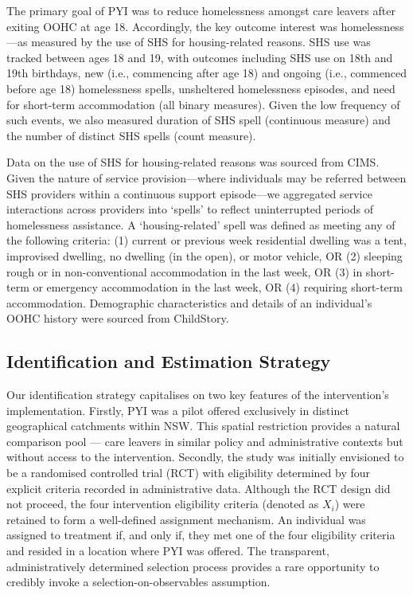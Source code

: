 \documentclass[
  jou,
  floatsintext,
  longtable,
  nolmodern,
  notxfonts,
  notimes,
  colorlinks=true,linkcolor=blue,citecolor=blue,urlcolor=blue]{apa7}
\begin{document}
The primary goal of PYI was to reduce homelessness amongst care leavers
after exiting OOHC at age 18. Accordingly, the key outcome interest was
homelessness---as measured by the use of SHS for housing-related
reasons. SHS use was tracked between ages 18 and 19, with outcomes
including SHS use on 18th and 19th birthdays, new (i.e., commencing
after age 18) and ongoing (i.e., commenced before age 18) homelessness
spells, unsheltered homelessness episodes, and need for short-term
accommodation (all binary measures). Given the low frequency of such
events, we also measured duration of SHS spell (continuous measure) and
the number of distinct SHS spells (count measure). ~

Data on the use of SHS for housing-related reasons was sourced from
CIMS. Given the nature of service provision---where individuals may be
referred between SHS providers within a continuous support episode---we
aggregated service interactions across providers into `spells' to
reflect uninterrupted periods of homelessness assistance. A
`housing-related' spell was defined as meeting any of the following
criteria: (1) current or previous week residential dwelling was a tent,
improvised dwelling, no dwelling (in the open), or motor vehicle, OR (2)
sleeping rough or in non-conventional accommodation in the last week, OR
(3) in short-term or emergency accommodation in the last week, OR (4)
requiring short-term accommodation. Demographic characteristics and
details of an individual's OOHC history were sourced from ChildStory.

\subsection{Identification and Estimation
Strategy}\label{identification-and-estimation-strategy}

Our identification strategy capitalises on two key features of the
intervention's implementation. Firstly, PYI was a pilot offered
exclusively in distinct geographical catchments within NSW. This spatial
restriction provides a natural comparison pool --- care leavers in
similar policy and administrative contexts but without access to the
intervention. Secondly, the study was initially envisioned to be a
randomised controlled trial (RCT) with eligibility determined by four
explicit criteria recorded in administrative data. Although the RCT
design did not proceed, the four intervention eligibility criteria
(denoted as \(X_i\)) were retained to form a well-defined assignment
mechanism. An individual was assigned to treatment if, and only if, they
met one of the four eligibility criteria and resided in a location where
PYI was offered. The transparent, administratively determined selection
process provides a rare opportunity to credibly invoke a
selection-on-observables assumption.
\end{document}
